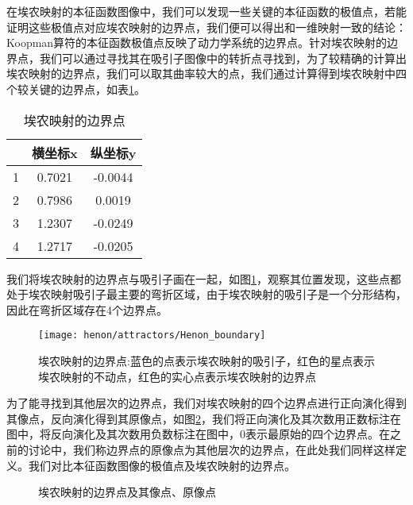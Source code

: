 在埃农映射的本征函数图像中，我们可以发现一些关键的本征函数的极值点，若能证明这些极值点对应埃农映射的边界点，我们便可以得出和一维映射一致的结论：Koopman算符的本征函数极值点反映了动力学系统的边界点。针对埃农映射的边界点，我们可以通过寻找其在吸引子图像中的转折点寻找到，为了较精确的计算出埃农映射的边界点，我们可以取其曲率较大的点，我们通过计算得到埃农映射中四个较关键的边界点，如表\ref{tab:henon_boundary}。
\begin{table}[]
    \centering
    \begin{tabular}{|c|c|c|}
    \hline
        & 横坐标x & 纵坐标y  \\ \hline
    1   & 0.7021 & -0.0044 \\ \hline
    2   & 0.7986 & 0.0019  \\ \hline
    3   & 1.2307 & -0.0249 \\ \hline
    4   & 1.2717 & -0.0205 \\ \hline
    \end{tabular}
    \caption{埃农映射的边界点}\label{tab:henon_boundary}
\end{table}
我们将埃农映射的边界点与吸引子画在一起，如图\ref{fig:henon_boundary}，观察其位置发现，这些点都处于埃农映射吸引子最主要的弯折区域，由于埃农映射的吸引子是一个分形结构，因此在弯折区域存在4个边界点。
\begin{figure}
	\centering
	\texttt{[image: henon/attractors/Henon\_boundary]}
    \caption[埃农映射的边界点]{埃农映射的边界点:蓝色的点表示埃农映射的吸引子，红色的星点表示埃农映射的不动点，红色的实心点表示埃农映射的边界点}\label{fig:henon_boundary}
\end{figure}
为了能寻找到其他层次的边界点，我们对埃农映射的四个边界点进行正向演化得到其像点，反向演化得到其原像点，如图\ref{fig:Henon_boundary_forward}，我们将正向演化及其次数用正数标注在图中，将反向演化及其次数用负数标注在图中，$0$表示最原始的四个边界点。在之前的讨论中，我们称边界点的原像点为其他层次的边界点，在此处我们同样这样定义。我们对比本征函数图像的极值点及埃农映射的边界点。
\begin{figure}
    \centering
    \caption{埃农映射的边界点及其像点、原像点}\label{fig:Henon_boundary_forward}
\end{figure}

